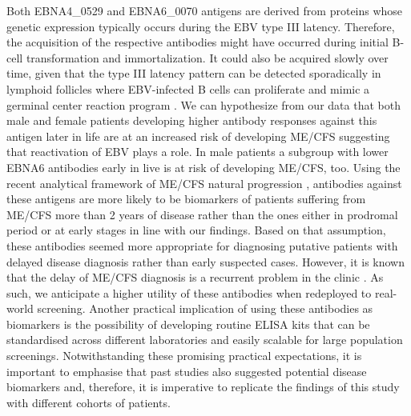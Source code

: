 Both EBNA4\_0529 and EBNA6\_0070 antigens are derived from proteins whose genetic expression typically occurs during the EBV type III latency. Therefore, the acquisition of the respective antibodies might have occurred during initial B-cell transformation and immortalization. It could also be acquired slowly over time, given that the type III latency pattern can be detected sporadically in lymphoid follicles where EBV-infected B cells can proliferate and mimic a germinal center reaction program \citep{thorley-lawson2015EBVPersistence}. We can hypothesize from our data that both male and female patients developing higher antibody responses against this antigen later in life are at an increased risk of developing ME/CFS suggesting that reactivation of EBV plays a role. In male patients a subgroup with lower EBNA6 antibodies early in live is at risk of developing ME/CFS, too. Using the recent analytical framework of ME/CFS natural progression \citep{nacul2020HowMyalgic}, antibodies against these antigens are more likely to be biomarkers of patients suffering from ME/CFS more than 2 years of disease rather than the ones either in prodromal period or at early stages in line with our findings. Based on that assumption, these antibodies seemed more appropriate for diagnosing putative patients with delayed disease diagnosis rather than early suspected cases. However, it is known that the delay of ME/CFS diagnosis is a recurrent problem in the clinic \citep{bateman2021MyalgicEncephalomyelitis, nacul2021EuropeanNetwork}. As such, we anticipate a higher utility of these antibodies when redeployed to real-world screening. Another practical implication of using these antibodies as biomarkers is the possibility of developing routine ELISA kits that can be standardised across different laboratories and easily scalable for large population screenings. Notwithstanding these promising practical expectations, it is important to emphasise that past studies also suggested potential disease biomarkers \citep{scheibenbogen2017EuropeanME} and, therefore, it is imperative to replicate the findings of this study with different cohorts of patients.

